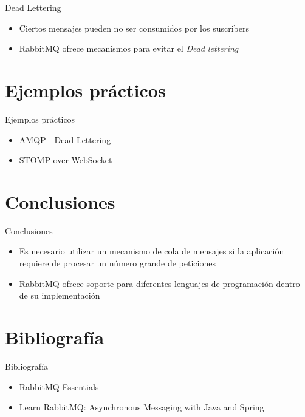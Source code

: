 \documentclass{beamer}
\begin{document}
  \begin{frame}{Dead Lettering}
    \begin{itemize}
      \item Ciertos mensajes pueden no ser consumidos por los suscribers
      \item RabbitMQ ofrece mecanismos para evitar el \textit{Dead lettering}
    \end{itemize}
  \end{frame}

  \section{Ejemplos prácticos}
  \begin{frame}{Ejemplos prácticos}
    \begin{itemize}
      \item AMQP - Dead Lettering
      \item STOMP over WebSocket
    \end{itemize}
  \end{frame}

  \section{Conclusiones}
  \begin{frame}{Conclusiones}
    \begin{itemize}
      \item Es necesario utilizar un mecanismo de cola de mensajes si
      la aplicación requiere de procesar un número grande de peticiones
      \item RabbitMQ ofrece soporte para diferentes lenguajes de programación
      dentro de su implementación
    \end{itemize}
  \end{frame}

  \section{Bibliografía}
  \begin{frame}{Bibliografía}
    \begin{itemize}
      \item RabbitMQ Essentials
      \item Learn RabbitMQ: Asynchronous Messaging with Java and Spring
    \end{itemize}
  \end{frame}
\end{document}
